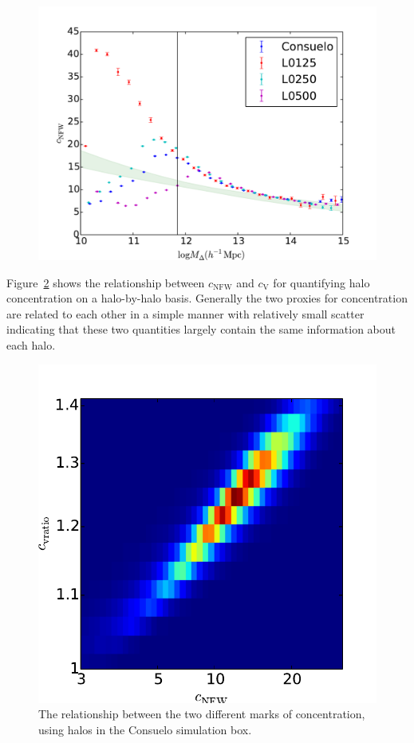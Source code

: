 \documentclass[usenatbib,usegraphicx,letterpaper]{mn2e}
\begin{document}
\begin{figure}
\centering
\includegraphics[width=.5\textwidth]{masscut_cnfw_d200.pdf}
\caption{}
\label{fig:cvrelation}
\end{figure}

Figure~\ref{fig:concentrations} shows the relationship between $c_{\mathrm{NFW}}$ and $c_{\mathrm{V}}$ for quantifying halo 
concentration on a halo-by-halo basis. Generally the two proxies for concentration are related to each other in a simple manner 
with relatively small scatter indicating that these two quantities largely contain the same information about each halo.

\begin{figure}
\centering
\includegraphics[width=.5\textwidth]{ldcompare_cnfwvscvrat_z00.pdf}
\caption{The relationship between the two different marks of concentration, using halos in the Consuelo simulation box.
}
\label{fig:concentrations}
\end{figure}
\end{document}
